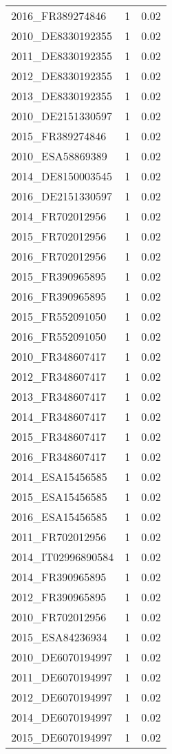 \begin{table*}[htbp]
\begin{tabular}{lrr}
2016_FR389274846 & 1 & 0.02 \\
2010_DE8330192355 & 1 & 0.02 \\
2011_DE8330192355 & 1 & 0.02 \\
2012_DE8330192355 & 1 & 0.02 \\
2013_DE8330192355 & 1 & 0.02 \\
2010_DE2151330597 & 1 & 0.02 \\
2015_FR389274846 & 1 & 0.02 \\
2010_ESA58869389 & 1 & 0.02 \\
2014_DE8150003545 & 1 & 0.02 \\
2016_DE2151330597 & 1 & 0.02 \\
2014_FR702012956 & 1 & 0.02 \\
2015_FR702012956 & 1 & 0.02 \\
2016_FR702012956 & 1 & 0.02 \\
2015_FR390965895 & 1 & 0.02 \\
2016_FR390965895 & 1 & 0.02 \\
2015_FR552091050 & 1 & 0.02 \\
2016_FR552091050 & 1 & 0.02 \\
2010_FR348607417 & 1 & 0.02 \\
2012_FR348607417 & 1 & 0.02 \\
2013_FR348607417 & 1 & 0.02 \\
2014_FR348607417 & 1 & 0.02 \\
2015_FR348607417 & 1 & 0.02 \\
2016_FR348607417 & 1 & 0.02 \\
2014_ESA15456585 & 1 & 0.02 \\
2015_ESA15456585 & 1 & 0.02 \\
2016_ESA15456585 & 1 & 0.02 \\
2011_FR702012956 & 1 & 0.02 \\
2014_IT02996890584 & 1 & 0.02 \\
2014_FR390965895 & 1 & 0.02 \\
2012_FR390965895 & 1 & 0.02 \\
2010_FR702012956 & 1 & 0.02 \\
2015_ESA84236934 & 1 & 0.02 \\
2010_DE6070194997 & 1 & 0.02 \\
2011_DE6070194997 & 1 & 0.02 \\
2012_DE6070194997 & 1 & 0.02 \\
2014_DE6070194997 & 1 & 0.02 \\
2015_DE6070194997 & 1 & 0.02 \\

\end{tabular}
\end{table*}
